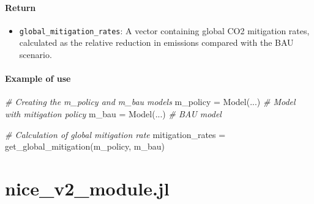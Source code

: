 \documentclass[
]{article}
\newenvironment{Shaded}{}{}
\newcommand{\CommentTok}[1]{\textcolor[rgb]{0.38,0.63,0.69}{\textit{#1}}}
\newcommand{\FunctionTok}[1]{\textcolor[rgb]{0.02,0.16,0.49}{#1}}
\newcommand{\NormalTok}[1]{#1}
\newcommand{\OperatorTok}[1]{\textcolor[rgb]{0.40,0.40,0.40}{#1}}
\providecommand{\tightlist}{%
  \setlength{\itemsep}{0pt}\setlength{\parskip}{0pt}}
\begin{document}
\paragraph{Return}\label{return-3}

\begin{itemize}
\tightlist
\item
  \texttt{global\_mitigation\_rates}: A vector containing global CO2
  mitigation rates, calculated as the relative reduction in emissions
  compared with the BAU scenario.
\end{itemize}

\paragraph{Example of use}\label{example-of-use-1}

\begin{Shaded}
\begin{Highlighting}[]
\CommentTok{\# Creating the m\_policy and m\_bau models}
\NormalTok{m\_policy }\OperatorTok{=} \FunctionTok{Model}\NormalTok{(}\OperatorTok{...}\NormalTok{) }\CommentTok{\# Model with mitigation policy}
\NormalTok{m\_bau }\OperatorTok{=} \FunctionTok{Model}\NormalTok{(}\OperatorTok{...}\NormalTok{) }\CommentTok{\# BAU model}

\CommentTok{\# Calculation of global mitigation rate}
\NormalTok{mitigation\_rates }\OperatorTok{=} \FunctionTok{get\_global\_mitigation}\NormalTok{(m\_policy, m\_bau)}
\end{Highlighting}
\end{Shaded}

%
%

\section{nice\_v2\_module.jl}\label{nice_v2_module.jl}
\end{document}
